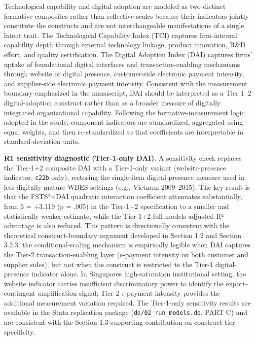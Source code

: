\documentclass[12pt,a4paper]{article}
\begin{document}
Technological capability and digital adoption are modeled as two
distinct formative composites rather than reflective scales because
their indicators jointly constitute the constructs and are not
interchangeable manifestations of a single latent trait. The
Technological Capability Index (TCI) captures firm-internal capability
depth through external technology linkage, product innovation, R\&D
effort, and quality certification. The Digital Adoption Index (DAI)
captures firms' uptake of foundational digital interfaces and
transaction-enabling mechanisms through website or digital presence,
customer-side electronic payment intensity, and supplier-side electronic
payment intensity. Consistent with the measurement boundary emphasized
in the manuscript, DAI should be interpreted as a Tier 1--2
digital-adoption construct rather than as a broader measure of digitally
integrated organizational capability. Following the
formative-measurement logic adopted in the study, component indicators
are standardized, aggregated using equal weights, and then
re-standardized so that coefficients are interpretable in
standard-deviation units.

\textbf{R1 sensitivity diagnostic (Tier-1-only DAI).} A sensitivity
check replaces the Tier-1+2 composite DAI with a Tier-1-only variant
(website-presence indicator, \texttt{c22b} only), restoring the
single-item digital-presence measure used in less digitally mature WBES
settings (e.g., Vietnam 2009--2015). The key result is that the
FSTS²×DAI quadratic interaction coefficient attenuates substantially,
from β = +3.119 (p = .005) in the Tier-1+2 specification to a smaller
and statistically weaker estimate, while the Tier-1+2 full
model\textquotesingle s adjusted R² advantage is also reduced. This
pattern is directionally consistent with the theoretical
construct-boundary argument developed in Section 1.2 and Section 3.2.3:
the conditional-scaling mechanism is empirically legible when DAI
captures the Tier-2 transaction-enabling layer (e-payment intensity on
both customer and supplier sides), but not when the construct is
restricted to the Tier-1 digital-presence indicator alone. In
Singapore\textquotesingle s high-saturation institutional setting, the
website indicator carries insufficient discriminatory power to identify
the export-contingent amplification signal; Tier-2 e-payment intensity
provides the additional measurement variation required. The Tier-1-only
sensitivity results are available in the Stata replication package
(\texttt{do/02\_run\_models.do}, PART C) and are consistent with the
Section 1.3 supporting contribution on construct-tier specificity.
\end{document}

